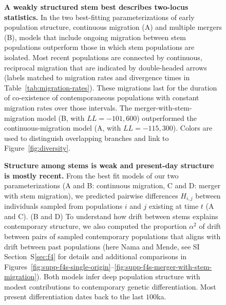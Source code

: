 \documentclass[]{article}
\begin{document}
\begin{figure}[t!]
    \centering
    \caption{
        \textbf{A weakly structured stem best describes two-locus statistics.}
        In the two best-fitting parameterizations of early population structure,
        continuous migration (A) and multiple mergers (B), models
        that include ongoing migration between stem populations outperform
        those in which stem populations are isolated. Most recent populations are
        connected by continuous, reciprocal migration that are indicated by 
        double-headed arrows (labels matched to migration rates and divergence
        times in Table~\ref{tab:migration-rates}). These migrations last for the
        duration of co-existence of contemporaneous populations with constant
        migration rates over those intervals. The
        merger-with-stem-migration model (B, with  $LL=-101,600$) outperformed the
        continuous-migration model (A, with $LL=-115,300$).
        Colors are used to distinguish overlapping branches and link to
        Figure~\ref{fig:diversity}.}
    \label{fig:best-fit-models}
\end{figure}

\begin{figure}[t!]
    \centering
    \caption{
        \textbf{Structure among stems is weak and present-day structure is mostly recent.}
        From the best fit models of our two parameterizations (A and B:
        continuous migration, C and D: merger with stem migration),
        we predicted pairwise differences $H_{i,j}$ between individuals
        sampled from populations $i$ and $j$ existing at time $t$ (A and C).
        (B and D) To understand how drift between stems explains contemporary structure, 
        we also computed the proportion $\alpha^2$ of drift between pairs of
        sampled contemporary
        populations that aligns with drift between past populations
        (here Nama and Mende, see SI Section~S\ref{sec:f4}
        for details and additional comparisons in
        Figures~\ref{fig:supp-f4s-single-origin}--\ref{fig:supp-f4s-merger-with-stem-migration}).
        Both models infer deep population structure with modest contributions to
        contemporary genetic differentiation.
        Most present differentiation dates back to the last $100$ka.
    }
    \label{fig:predictions}
\end{figure}
\end{document}
